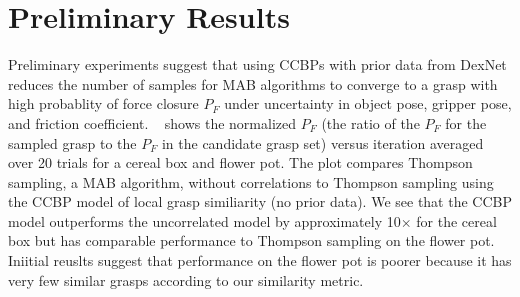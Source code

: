 \section{Preliminary Results}
Preliminary experiments suggest that using CCBPs with prior data from DexNet reduces the number of samples for MAB algorithms to converge to a grasp with high probablity of force closure $P_F$ under uncertainty in object pose, gripper pose, and friction coefficient.
~ shows the normalized $P_F$ (the ratio of the $P_F$ for the sampled grasp to the $P_F$ in the candidate grasp set) versus iteration averaged over 20 trials for a cereal box and flower pot.
The plot compares Thompson sampling, a MAB algorithm, without correlations to Thompson sampling using the CCBP model of local grasp similiarity (no prior data).
We see that the CCBP model outperforms the uncorrelated model by approximately 10$\times$ for the cereal box but has comparable performance to Thompson sampling on the flower pot.
Iniitial reuslts suggest that performance on the flower pot is poorer because it has very few similar grasps according to our similarity metric.

